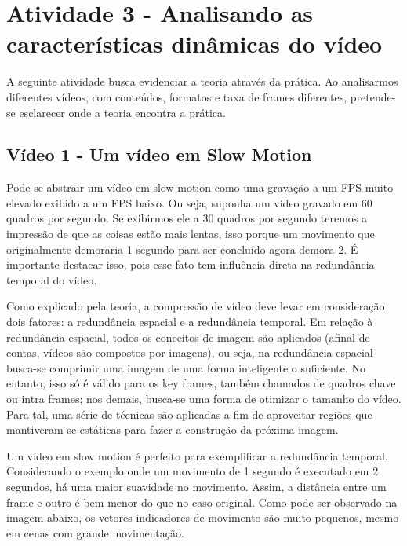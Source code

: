 \captionsetup{justification=centering,margin=0cm}
\label{cap:atividade3}  %

\chapter[Atividade 3 - Analisando as características dinâmicas do vídeo]{Atividade 3 - Analisando as características dinâmicas do vídeo}

A seguinte atividade busca evidenciar a teoria através da prática. Ao analisarmos diferentes vídeos, com conteúdos, formatos e taxa de frames diferentes, pretende-se esclarecer onde a teoria encontra a prática.

\section{Vídeo 1 - Um vídeo em Slow Motion}
Pode-se abstrair um vídeo em slow motion como uma gravação a um FPS muito elevado exibido a um FPS baixo. Ou seja, suponha um vídeo gravado em 60 quadros por segundo. Se exibirmos ele a 30 quadros por segundo teremos a impressão de que as coisas estão mais lentas, isso porque um movimento que originalmente demoraria 1 segundo para ser concluído agora demora 2. É importante destacar isso, pois esse fato tem influência direta na redundância temporal do vídeo.

\paragrafo Como explicado pela teoria, a compressão de vídeo deve levar em consideração dois fatores: a redundância espacial e a redundância temporal. Em relação à redundância espacial, todos os conceitos de imagem são aplicados (afinal de contas, vídeos são compostos por imagens), ou seja, na redundância espacial busca-se comprimir uma imagem de uma forma inteligente o suficiente. No entanto, isso só é válido para os key frames, também chamados de quadros chave ou intra frames; nos demais, busca-se uma forma de otimizar o tamanho do vídeo. Para tal, uma série de técnicas são aplicadas a fim de aproveitar regiões que mantiveram-se estáticas para fazer a construção da próxima imagem.

\paragrafo Um vídeo em slow motion é perfeito para exemplificar a redundância temporal. Considerando o exemplo onde um movimento de 1 segundo é executado em 2 segundos, há uma maior suavidade no movimento. Assim, a distância entre um frame e outro é bem menor do que no caso original. Como pode ser observado na imagem abaixo, os vetores indicadores de movimento são muito pequenos, mesmo em cenas com grande movimentação.

